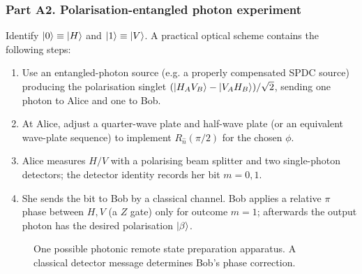 \subsubsection*{Part A2. Polarisation-entangled photon experiment}
Identify $\left\lvert 0\right\rangle\equiv\left\lvert H\right\rangle$ and $\left\lvert 1\right\rangle\equiv\left\lvert V\right\rangle$. A practical optical scheme contains the following steps:
\begin{enumerate}
\item Use an entangled-photon source (e.g. a properly compensated SPDC source) producing the polarisation singlet $(\left\lvert H_AV_B\right\rangle-\left\lvert V_AH_B\right\rangle)/\sqrt2$, sending one photon to Alice and one to Bob.
\item At Alice, adjust a quarter-wave plate and half-wave plate (or an equivalent wave-plate sequence) to implement $R_{\hat n}(\pi/2)$ for the chosen $\phi$.
\item Alice measures $H/V$ with a polarising beam splitter and two single-photon detectors; the detector identity records her bit $m=0,1$.
\item She sends the bit to Bob by a classical channel. Bob applies a relative $\pi$ phase between $H,V$ (a $Z$ gate) only for outcome $m=1$; afterwards the output photon has the desired polarisation $\left\lvert \beta\right\rangle$.
\end{enumerate}
\begin{figure}[htbp]\centering
{}
\caption{One possible photonic remote state preparation apparatus. A classical detector message determines Bob's phase correction.}
\end{figure}

